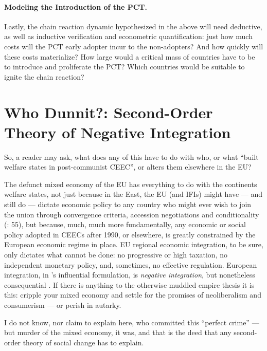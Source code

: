\paragraph{Modeling the Introduction of the PCT.} Lastly, the chain reaction dynamic hypothesized in the above will need deductive, as well as inductive verification and econometric quantification: just how much costs will the PCT early adopter incur to the non-adopters? And how quickly will these costs materialize? How large would a critical mass of countries have to be to introduce and proliferate the PCT? Which countries would be suitable to ignite the chain reaction?
\clearpage

\section{Who Dunnit?: Second-Order Theory of Negative Integration} \label{sec:who-dunnit}

So, a reader may ask, what does any of this have to do with who, or what  ``built welfare states in post-communist \gls{CEEC}'', or alters them elsewhere in the \gls{EU}? 

The defunct mixed economy of the \gls{EU} has everything to do with the continents welfare states, not just because in the East, the \gls{EU} (and \glspl{IFI}) might have --- and still do --- dictate economic policy to any country who might ever wish to join the union through convergence criteria, accession negotiations and conditionality (\citealt{Bonker2006}: 55), but because, much, much more fundamentally, any economic or social policy adopted in \glspl{CEEC} after 1990, or elsewhere, is greatly constrained by the European economic regime in place. \gls{EU} regional economic integration, to be sure, only dictates what cannot be done: no progressive or high taxation, no independent monetary policy, and, sometimes, no effective regulation. %
European integration, in \citeauthor{Scharpf1997}'s influential formulation, is \emph{negative integration}, but nonetheless consequential \citep{Scharpf1997}. If there is anything to the otherwise muddled empire thesis \citep{BeckGrande-2007-aa} it is this: cripple your mixed economy and settle for the promises of neoliberalism and consumerism --- or perish in autarky.

I do not know, nor claim to explain here, who committed this ``perfect crime'' \citep{Galbraith2002a} --- but murder of the mixed economy, it was, and that is the deed that any second-order theory of social change has to explain.





